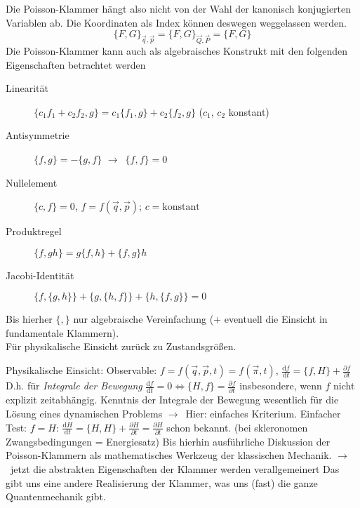\documentclass[oneside]{book}
\theoremstyle{definition}
\newcommand{\conseq}{$\rightarrow$~}
\renewcommand{\d}{\mathrm d}
\newcommand{\ddd}[2]{\frac{\d #1}{\d #2}}
\newcommand{\ffpartial}[2]{\frac{\partial #1}{\partial #2}}
\newcommand{\const}{\text{konstant}}
\begin{document}
Die Poisson-Klammer hängt also nicht von der Wahl der kanonisch konjugierten Variablen ab. Die Koordinaten als Index können deswegen weggelassen werden.
$$\{F, G\}_{\vec{q}, \vec{p}} = \{F, G\}_{\vec{Q}, \vec{P}} = \{F, G\}$$
Die Poisson-Klammer kann auch als algebraisches Konstrukt mit den folgenden Eigenschaften betrachtet werden 
\begin{description}
	\item[Linearität] $\{c_1 f_1 + c_2 f_2, g\} = c_1 \{f_1, g\} + c_2 \{f_2, g\}$ ($c_1$, $c_2$ konstant)
	\item[Antisymmetrie] $\{f, g\} = - \{g, f\}$ \conseq $\{f, f\} = 0$
	\item[Nullelement] $\{c, f\} = 0$, $f=f(\vec{q}, \vec{p})$; $c = \const$
	\item[Produktregel] $\{f, g h\} = g \{f, h\} + \{f, g\} h$
	\item[Jacobi-Identität] $\{f, \{g, h\}\} + \{g, \{h, f\}\} + \{h, \{f, g\}\} = 0$
\end{description}

Bis hierher $\{,\}$ nur algebraische Vereinfachung (+ eventuell die Einsicht in fundamentale Klammern).\\
Für physikalische Einsicht zurück zu Zustandsgrößen.

Physikalische Einsicht:
Observable: $f = f(\vec{q}, \vec{p}, t) = f(\vec{\pi}, t)$, $\ddd{f}{t} = \{f, H\} + \ffpartial{f}{t}$
D.h. für \textit{Integrale der Bewegung}
$\ddd{f}{t} = 0 \Leftrightarrow \{H, f\} = \ffpartial{f}{t}$
insbesondere, wenn $f$ nicht explizit zeitabhängig. Kenntnis der Integrale der Bewegung wesentlich für die Lösung eines dynamischen Problems \conseq Hier: einfaches Kriterium.
Einfacher Test: $f = H$: $\ddd{H}{t} = \{H, H\} + \ffpartial{H}{t} = \ffpartial{H}{t}$ schon bekannt. (bei skleronomen Zwangsbedingungen = Energiesatz) 
Bis hierhin ausführliche Diskussion der Poisson-Klammern als mathematisches Werkzeug der klassischen Mechanik.
\conseq jetzt die abstrakten Eigenschaften der Klammer werden verallgemeinert
Das gibt uns eine andere Realisierung der Klammer, was uns (fast) die ganze Quantenmechanik gibt.

\newcommand{\fihbar}{\frac{1}{i \hbar}}
\end{document}
